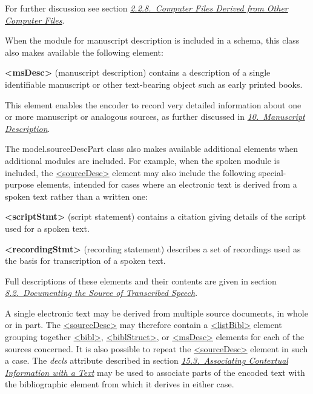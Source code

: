 For further discussion see section \textit{\hyperref[HD31]{2.2.8.\ Computer Files Derived from Other Computer Files}}.\par
When the module for manuscript description is included in a schema, this class also makes available the following element: 
\begin{sansreflist}
  
\item [\textbf{<msDesc>}] (manuscript description) contains a description of a single identifiable manuscript or other text-bearing object such as early printed books.
\end{sansreflist}
 This element enables the encoder to record very detailed information about one or more manuscript or analogous sources, as further discussed in \textit{\hyperref[MS]{10.\ Manuscript Description}}.\par
The \textsf{model.sourceDescPart} class also makes available additional elements when additional modules are included. For example, when the \textsf{spoken} module is included, the \hyperref[TEI.sourceDesc]{<sourceDesc>} element may also include the following special-purpose elements, intended for cases where an electronic text is derived from a spoken text rather than a written one: 
\begin{sansreflist}
  
\item [\textbf{<scriptStmt>}] (script statement) contains a citation giving details of the script used for a spoken text.
\item [\textbf{<recordingStmt>}] (recording statement) describes a set of recordings used as the basis for transcription of a spoken text.
\end{sansreflist}
 Full descriptions of these elements and their contents are given in section \textit{\hyperref[HD32]{8.2.\ Documenting the Source of Transcribed Speech}}.\par
A single electronic text may be derived from multiple source documents, in whole or in part. The \hyperref[TEI.sourceDesc]{<sourceDesc>} may therefore contain a \hyperref[TEI.listBibl]{<listBibl>} element grouping together \hyperref[TEI.bibl]{<bibl>}, \hyperref[TEI.biblStruct]{<biblStruct>}, or \hyperref[TEI.msDesc]{<msDesc>} elements for each of the sources concerned. It is also possible to repeat the \hyperref[TEI.sourceDesc]{<sourceDesc>} element in such a case. The {\itshape decls} attribute described in section \textit{\hyperref[CCAS]{15.3.\ Associating Contextual Information with a Text}} may be used to associate parts of the encoded text with the bibliographic element from which it derives in either case.\par
